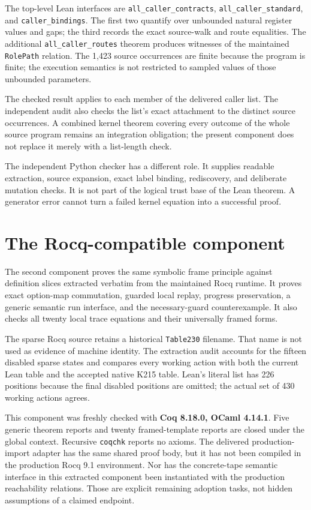 \documentclass[11pt]{article}
\theoremstyle{definition}\newtheorem{definition}[theorem]{Definition}
\theoremstyle{remark}\newtheorem{remark}[theorem]{Remark}
\newcommand{\code}[1]{\nolinkurl{#1}}
\begin{document}
The top-level Lean interfaces are \code{all_caller_contracts}, \code{all_caller_standard}, and \code{caller_bindings}. The first two quantify over unbounded natural register values and gaps; the third records the exact source-walk and route equalities. The additional \code{all_caller_routes} theorem produces witnesses of the maintained \code{RolePath} relation. The 1,423 source occurrences are finite because the program is finite; the execution semantics is not restricted to sampled values of those unbounded parameters.

The checked result applies to each member of the delivered caller list. The independent audit also checks the list's exact attachment to the distinct source occurrences. A combined kernel theorem covering every outcome of the whole source program remains an integration obligation; the present component does not replace it merely with a list-length check.

The independent Python checker has a different role. It supplies readable extraction, source expansion, exact label binding, rediscovery, and deliberate mutation checks. It is not part of the logical trust base of the Lean theorem. A generator error cannot turn a failed kernel equation into a successful proof.

\section{The Rocq-compatible component}

The second component proves the same symbolic frame principle against definition slices extracted verbatim from the maintained Rocq runtime. It proves exact option-map commutation, guarded local replay, progress preservation, a generic semantic run interface, and the necessary-guard counterexample. It also checks all twenty local trace equations and their universally framed forms.

The sparse Rocq source retains a historical \code{Table230} filename. That name is not used as evidence of machine identity. The extraction audit accounts for the fifteen disabled sparse states and compares every working action with both the current Lean table and the accepted native K215 table. Lean's literal list has 226 positions because the final disabled positions are omitted; the actual set of 430 working actions agrees.

This component was freshly checked with \textbf{Coq 8.18.0, OCaml 4.14.1}. Five generic theorem reports and twenty framed-template reports are closed under the global context. Recursive \code{coqchk} reports no axioms. The delivered production-import adapter has the same shared proof body, but it has not been compiled in the production Rocq 9.1 environment. Nor has the concrete-tape semantic interface in this extracted component been instantiated with the production reachability relations. Those are explicit remaining adoption tasks, not hidden assumptions of a claimed endpoint.
\end{document}
